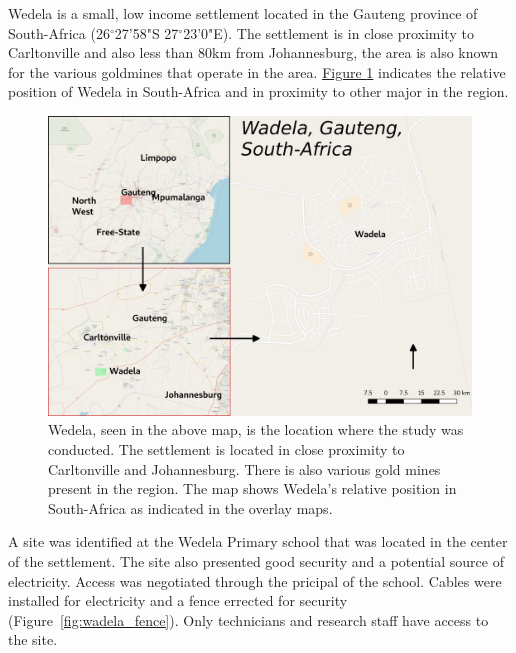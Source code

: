 \documentclass{nwureport}
\begin{document}
Wedela is a small, low income settlement located in the Gauteng province of
South-Africa (26$^\circ$27'58"S 27$^\circ$23'0"E). The settlement is in close proximity to Carltonville
and also less than 80km from Johannesburg, the area is also known for the various goldmines
that operate in the area. \hyperref[fig:wadela]{Figure \ref{fig:wadela}}
indicates the relative position of Wedela in South-Africa and in proximity to other major
in the region.

\begin{figure}[!htb]
    \centering
    \includegraphics[width=\textwidth]{images/study_area_qgis.png}
    \caption[Study area: Wedela, Gauteng]{Wedela, seen in the above map, is the location where
    the study was conducted. The settlement is located in close proximity to Carltonville and Johannesburg.
    There is also various gold mines present in the region. The map shows Wedela's relative position in
    South-Africa as indicated in the overlay maps.}
    \label{fig:wadela}
\end{figure}

A site was identified at the Wedela Primary school that was located in the center of the settlement. The site also presented good security and a potential source of electricity. Access was negotiated through the pricipal of the school. Cables were installed for electricity and a fence errected for security (Figure~\ref{fig:wadela_fence}). Only technicians and research staff have access to the site.
\end{document}

